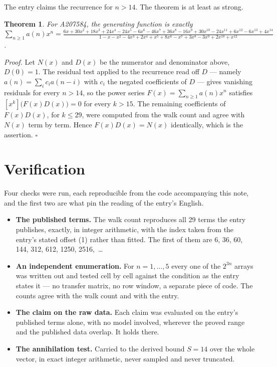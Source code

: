 \documentclass[11pt]{article}
\newtheorem{theorem}{Theorem}
\theoremstyle{definition}
\begin{document}
The entry claims the recurrence for $n > 14$. The theorem is at least as strong.

\begin{theorem} For A207584, the generating function is exactly $\sum_{n\ge 1} a(n)x^n = \frac{6x + 30x^{2} + 18x^{3} + 24x^{4} - 24x^{5} - 6x^{6} - 46x^{7} + 36x^{8} - 16x^{9} + 30x^{10} - 24x^{11} + 6x^{12} - 6x^{13} + 4x^{14}}{1 - x - x^{2} - 4x^{3} + 2x^{4} + x^{5} + 8x^{6} - x^{7} + 3x^{8} - 3x^{9} + 2x^{10} + x^{12}}$.\end{theorem}

{\itshape Proof.} Let $N(x)$ and $D(x)$ be the numerator and denominator above, $D(0)=1$. The residual test applied to the recurrence read off $D$ --- namely $a(n) = \sum_i c_i a(n-i)$ with $c_i$ the negated coefficients of $D$ --- gives vanishing residuals for every $n > 14$, so the power series $F(x)=\sum_{n\ge 1}a(n)x^n$ satisfies $[x^k]\bigl(F(x)D(x)\bigr) = 0$ for every $k > 15$. The remaining coefficients of $F(x)D(x)$, for $k \le 29$, were computed from the walk count and agree with $N(x)$ term by term. Hence $F(x)D(x) = N(x)$ identically, which is the assertion. $\square$

\section{Verification}

Four checks were run, each reproducible from the code accompanying this note, and the first two are what pin the reading of the entry's English.

\begin{itemize}

\item {\bfseries The published terms.} The walk count reproduces all 29 terms the entry publishes, exactly, in integer arithmetic, with the index taken from the entry's stated offset (1) rather than fitted. The first of them are 6, 36, 60, 144, 312, 612, 1250, 2516,~\dots

\item {\bfseries An independent enumeration.} For $n = 1,\dots,5$ every one of the $2^{3n}$ arrays was written out and tested cell by cell against the condition as the entry states it --- no transfer matrix, no row window, a separate piece of code. The counts agree with the walk count and with the entry.

\item {\bfseries The claim on the raw data.} Each claim was evaluated on the entry's published terms alone, with no model involved, wherever the proved range and the published data overlap. It holds there.

\item {\bfseries The annihilation test.} Carried to the derived bound $S = 14$ over the whole vector, in exact integer arithmetic, never sampled and never truncated.

\end{itemize}
\end{document}
